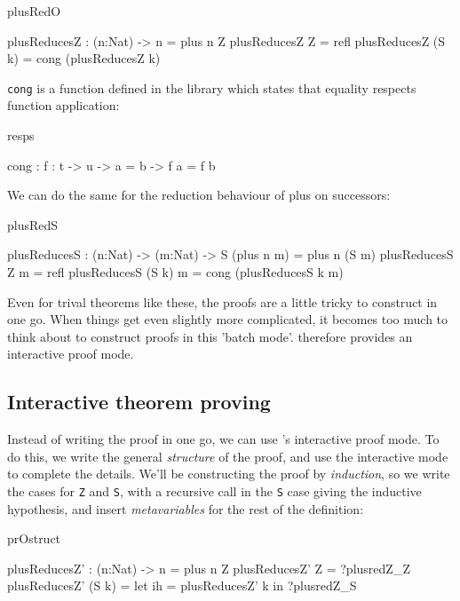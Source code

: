 \begin{SaveVerbatim}{plusRedO}

plusReducesZ : (n:Nat) -> n = plus n Z
plusReducesZ Z = refl
plusReducesZ (S k) = cong (plusReducesZ k)

\end{SaveVerbatim}

\noindent
\texttt{cong} is a function defined in the library which states that
equality respects function application:

\begin{SaveVerbatim}{resps}

cong : {f : t -> u} -> a = b -> f a = f b

\end{SaveVerbatim}

\noindent
We can do the same for the reduction behaviour of plus on successors:

\begin{SaveVerbatim}{plusRedS}

plusReducesS : (n:Nat) -> (m:Nat) -> S (plus n m) = plus n (S m)
plusReducesS Z m = refl
plusReducesS (S k) m = cong (plusReducesS k m)

\end{SaveVerbatim}

\noindent
Even for trival theorems like these, the proofs are a little tricky to
construct in one go. When things get even slightly more complicated, it becomes
too much to think about to construct proofs in this 'batch mode'. \Idris{}
therefore provides an interactive proof mode.

\subsection{Interactive theorem proving}

Instead of writing the proof in one go, we can use \Idris{}'s interactive
proof mode. To do this, we write the general \emph{structure} of the proof,
and use the interactive mode to complete the details. We'll be constructing
the proof by \emph{induction}, so we write the cases for \texttt{Z} and
\texttt{S}, with a recursive call in the \texttt{S} case giving the inductive
hypothesis, and insert \emph{metavariables} for the rest of the definition:

\begin{SaveVerbatim}{prOstruct}

plusReducesZ' : (n:Nat) -> n = plus n Z
plusReducesZ' Z     = ?plusredZ_Z
plusReducesZ' (S k) = let ih = plusReducesZ' k in
                      ?plusredZ_S

\end{SaveVerbatim}

